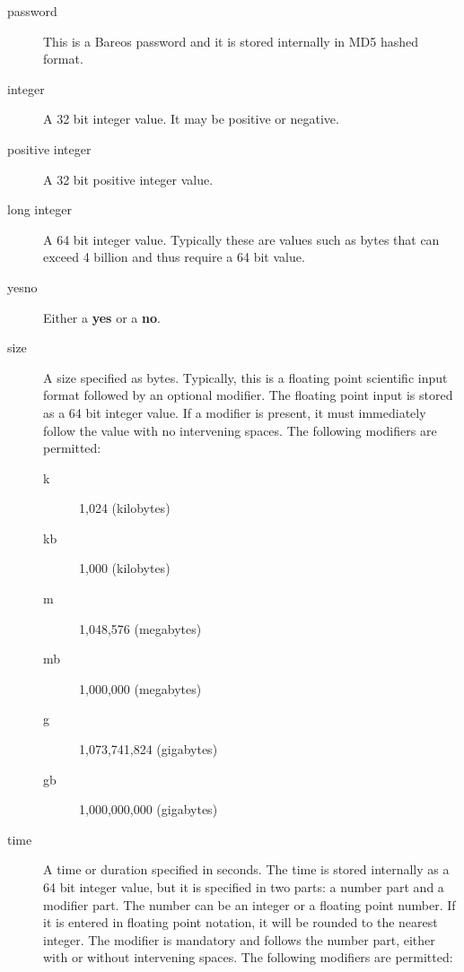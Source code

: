 \begin{description}
\item [password]
   This is a Bareos password and it is stored internally in MD5 hashed format.

\item [integer]
   A 32 bit integer value. It may be positive or negative.

\item [positive integer]
   A 32 bit positive integer value.

\item [long integer]
   A 64 bit integer value. Typically these  are values such as bytes that can
exceed 4 billion and thus  require a 64 bit value.

\item [yes{\textbar}no]
   Either a {\bf yes} or a {\bf no}.

\label{Size1}
\item [size]
A size specified as bytes. Typically, this is  a floating point scientific
input format followed by an optional modifier. The  floating point input is
stored as a 64 bit integer value.  If a modifier is present, it must
immediately follow the  value with no intervening spaces. The following
modifiers are permitted:

\begin{description}
\item [k]
   1,024 (kilobytes)

\item [kb]
   1,000 (kilobytes)

\item [m]
   1,048,576 (megabytes)

\item [mb]
   1,000,000 (megabytes)

\item [g]
   1,073,741,824 (gigabytes)

\item [gb]
   1,000,000,000 (gigabytes)
\end{description}

\label{Time}
\item [time]
A time or duration specified in seconds.  The time is stored internally as
a 64 bit integer value, but it is specified in two parts: a number part and
a modifier part.  The number can be an integer or a floating point number.
If it is entered in floating point notation, it will be rounded to the
nearest integer.  The modifier is mandatory and follows the number part,
either with or without intervening spaces.  The following modifiers are
permitted:


\end{description}
